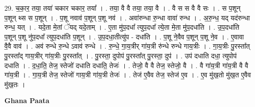 \documentclass[17pt]{extarticle}
\begin{document}
29. च॒का॒र॒ तया॒ तया॑ चकार चकार॒ तया᳚ । . तया॒ वै वै तया॒ तया॒ वै । . वै स स वै वै सः । . स प॒शून् प॒शून् थ्स स प॒शून् । . प॒शू नवाव॑ प॒शून् प॒शू नव॑ । . अवा॑रुन्धा रु॒न्धा वावा॑ रुन्ध । . अ॒रु॒न्ध॒ यद् यद॑रुन्धा रुन्ध॒ यत् । . यदे॒ता मे॒तां ॅयद् यदे॒ताम् । . ए॒ता मु॑प॒दधा᳚ त्युप॒दधा᳚ त्ये॒ता मे॒ता मु॑प॒दधा॑ति । . उ॒प॒दधा॑ति प॒शून् प॒शू नु॑प॒दधा᳚ त्युप॒दधा॑ति प॒शून् । . उ॒प॒दधा॒तीत्यु॑प - दधा॑ति । . प॒शू ने॒वैव प॒शून् प॒शू ने॒व । . ए॒वावा वै॒वै वाव॑ । . अव॑ रुन्धे रु॒न्धे ऽवाव॑ रुन्धे । . रु॒न्धे॒ गा॒य॒त्रीर् गा॑य॒त्री रु॑न्धे रुन्धे गाय॒त्रीः । . गा॒य॒त्रीः पु॒रस्ता᳚त् पु॒रस्ता᳚द् गाय॒त्रीर् गा॑य॒त्रीः पु॒रस्ता᳚त् । . पु॒रस्ता॒ दुपोप॑ पु॒रस्ता᳚त् पु॒रस्ता॒ दुप॑ । . उप॑ दधाति दधा॒ त्युपोप॑ दधाति । . द॒धा॒ति॒ तेज॒ स्तेजो॑ दधाति दधाति॒ तेजः॑ । . तेजो॒ वै वै तेज॒ स्तेजो॒ वै । . वै गा॑य॒त्री गा॑य॒त्री वै वै गा॑य॒त्री । . गा॒य॒त्री तेज॒ स्तेजो॑ गाय॒त्री गा॑य॒त्री तेजः॑ । . तेज॑ ए॒वैव तेज॒ स्तेज॑ ए॒व । . ए॒व मु॑ख॒तो मु॑ख॒त ए॒वैव मु॑ख॒तः । \newline

\textbf{Ghana Paata } \newline
\end{document}
